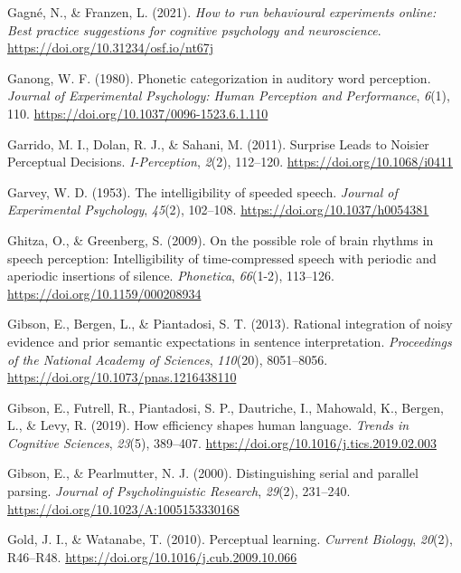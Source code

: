 \documentclass[a4paper, nobind]{templates/ociamthesis}
\newlength{\cslhangindent}
\newenvironment{CSLReferences}[2] %
 {%
  \setlength{\parindent}{0pt}
  \ifodd #1
  \let\oldpar\par
  \def\par{\hangindent=\cslhangindent\oldpar}
  \fi
  \setlength{\parskip}{1mm}
  \setlength{\baselineskip}{6mm}
 }%
 {}
\begin{document}
\begin{CSLReferences}{1}{0}
\leavevmode{}%
Gagné, N., \& Franzen, L. (2021). \emph{How to run behavioural experiments online: Best practice suggestions for cognitive psychology and neuroscience}. \url{https://doi.org/10.31234/osf.io/nt67j}

\leavevmode{}%
Ganong, W. F. (1980). Phonetic categorization in auditory word perception. \emph{Journal of Experimental Psychology: Human Perception and Performance}, \emph{6}(1), 110. \url{https://doi.org/10.1037/0096-1523.6.1.110}

\leavevmode{}%
Garrido, M. I., Dolan, R. J., \& Sahani, M. (2011). Surprise Leads to Noisier Perceptual Decisions. \emph{I-Perception}, \emph{2}(2), 112--120. \url{https://doi.org/10.1068/i0411}

\leavevmode{}%
Garvey, W. D. (1953). {The intelligibility of speeded speech}. \emph{Journal of Experimental Psychology}, \emph{45}(2), 102--108. \url{https://doi.org/10.1037/h0054381}

\leavevmode{}%
Ghitza, O., \& Greenberg, S. (2009). {On the possible role of brain rhythms in speech perception: Intelligibility of time-compressed speech with periodic and aperiodic insertions of silence}. \emph{Phonetica}, \emph{66}(1-2), 113--126. \url{https://doi.org/10.1159/000208934}

\leavevmode{}%
Gibson, E., Bergen, L., \& Piantadosi, S. T. (2013). Rational integration of noisy evidence and prior semantic expectations in sentence interpretation. \emph{Proceedings of the National Academy of Sciences}, \emph{110}(20), 8051--8056. \url{https://doi.org/10.1073/pnas.1216438110}

\leavevmode{}%
Gibson, E., Futrell, R., Piantadosi, S. P., Dautriche, I., Mahowald, K., Bergen, L., \& Levy, R. (2019). How efficiency shapes human language. \emph{Trends in Cognitive Sciences}, \emph{23}(5), 389--407. \url{https://doi.org/10.1016/j.tics.2019.02.003}

\leavevmode{}%
Gibson, E., \& Pearlmutter, N. J. (2000). Distinguishing serial and parallel parsing. \emph{Journal of Psycholinguistic Research}, \emph{29}(2), 231--240. \url{https://doi.org/10.1023/A:1005153330168}

\leavevmode{}%
Gold, J. I., \& Watanabe, T. (2010). Perceptual learning. \emph{Current Biology}, \emph{20}(2), R46--R48. \url{https://doi.org/10.1016/j.cub.2009.10.066}


\end{CSLReferences}
\end{document}

